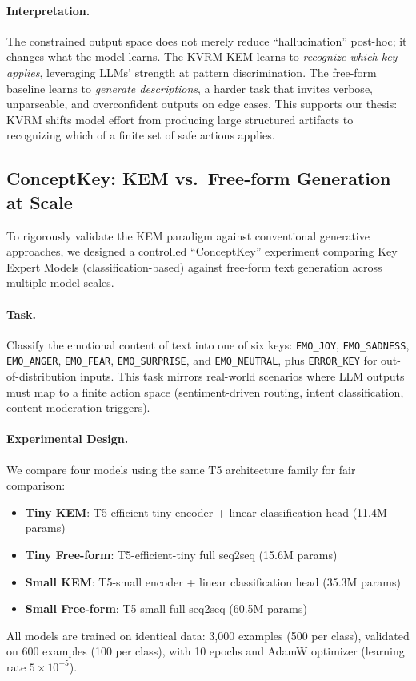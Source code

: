 \documentclass[11pt]{article}
\begin{document}
\paragraph{Interpretation.}
The constrained output space does not merely reduce ``hallucination'' post-hoc; it changes what the model learns.
The KVRM KEM learns to \emph{recognize which key applies}, leveraging LLMs' strength at pattern discrimination.
The free-form baseline learns to \emph{generate descriptions}, a harder task that invites verbose, unparseable, and overconfident outputs on edge cases.
This supports our thesis: KVRM shifts model effort from producing large structured artifacts to recognizing which of a finite set of safe actions applies.

\subsection{ConceptKey: KEM vs.\ Free-form Generation at Scale}
To rigorously validate the KEM paradigm against conventional generative approaches, we designed a controlled ``ConceptKey'' experiment comparing Key Expert Models (classification-based) against free-form text generation across multiple model scales.

\paragraph{Task.}
Classify the emotional content of text into one of six keys: \texttt{EMO\_JOY}, \texttt{EMO\_SADNESS}, \texttt{EMO\_ANGER}, \texttt{EMO\_FEAR}, \texttt{EMO\_SURPRISE}, and \texttt{EMO\_NEUTRAL}, plus \texttt{ERROR\_KEY} for out-of-distribution inputs.
This task mirrors real-world scenarios where LLM outputs must map to a finite action space (sentiment-driven routing, intent classification, content moderation triggers).

\paragraph{Experimental Design.}
We compare four models using the same T5 architecture family for fair comparison:
\begin{itemize}[leftmargin=*]
  \item \textbf{Tiny KEM}: T5-efficient-tiny encoder + linear classification head (11.4M params)
  \item \textbf{Tiny Free-form}: T5-efficient-tiny full seq2seq (15.6M params)
  \item \textbf{Small KEM}: T5-small encoder + linear classification head (35.3M params)
  \item \textbf{Small Free-form}: T5-small full seq2seq (60.5M params)
\end{itemize}
All models are trained on identical data: 3{,}000 examples (500 per class), validated on 600 examples (100 per class), with 10 epochs and AdamW optimizer (learning rate $5 \times 10^{-5}$).
\end{document}
